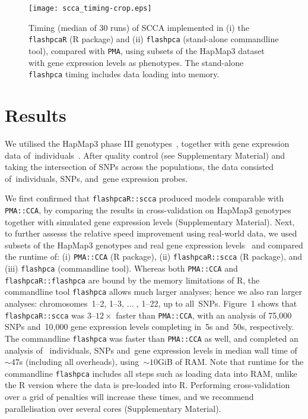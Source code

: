 \begin{figure}[!tpb]
\centerline{\texttt{[image: scca\_timing-crop.eps]}}
\caption{
Timing (median of 30 runs) of SCCA implemented in (i) the \texttt{flashpcaR}
(\textsf{R} package) and (ii) \texttt{flashpca} (stand-alone commandline tool),
compared with \texttt{PMA}, using subsets of the HapMap3 dataset with gene
expression levels as phenotypes. The stand-alone \texttt{flashpca} timing
includes data loading into memory.
}
\label{fig:01}
\end{figure}

\section{Results}

We utilised the HapMap3 phase III genotypes~\citep{hapmap2010}, together with
gene expression data of~\nindiv individuals~\citep{Stranger2012}. After quality
control (see Supplementary Material) and taking the intersection of SNPs
across the populations, the data consisted of~\nindiv individuals, \nsnps
SNPs, and~\ngenes gene expression probes.

We first confirmed that \texttt{flashpcaR::scca} produced models comparable
with \texttt{PMA::CCA}, by comparing the results in cross-validation on HapMap3
genotypes together with simulated gene expression levels (Supplementary
Material).  Next, to further assesss the relative speed improvement using
real-world data, we used subsets of the HapMap3 genotypes and real gene
expression levels~\citep{Stranger2012} and compared the runtime of: (i)
\texttt{PMA::CCA} (\textsf{R} package), (ii) \texttt{flashpcaR::scca}
(\textsf{R} package), and (iii) \texttt{flashpca} (commandline tool).
Whereas both \texttt{PMA::CCA} and \texttt{flashpcaR::flashpca} are bound by
the memory limitations of \textsf{R}, the commandline tool \texttt{flashpca}
allows much larger analyses; hence we also ran larger analyses:
chromosomes~1--2, 1--3, $\hdots$ , 1--22, up to all~\nsnps SNPs.
Figure~1\vphantom{\ref{fig:01}} shows that \texttt{flashpcaR::scca} was
$3\text{--}12\times$ faster than \texttt{PMA::CCA}, with an analysis
of 75,000 SNPs and~10,000 gene expression levels completing in~5s
and~50s, respectively. The commandline \texttt{flashpca} was faster
than \texttt{PMA::CCA} as well, and completed an analysis of~\nindiv
individuals, \nsnps SNPs and~\ngenes gene expression levels in median wall
time of ${\sim}47$s (including all overheads), using~${\sim}10$GiB of RAM.
Note that runtime for the commandline \texttt{flashpca} includes all steps
such as loading data into RAM, unlike the \textsf{R} version where the data
is pre-loaded into \textsf{R}.  Performing cross-validation over a grid of
penalties will increase these times, and we recommend
parallelisation over several cores (Supplementary Material).\vspace*{-12pt}

